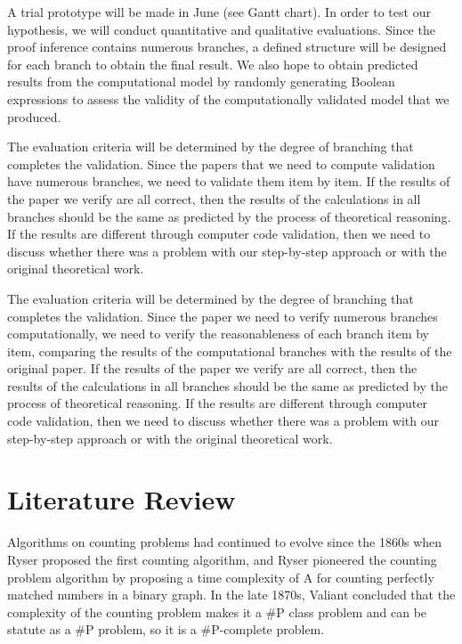 \documentclass{sigchi}
\begin{document}
A trial prototype will be made in June (see Gantt chart). In order to test our hypothesis, we will conduct quantitative and qualitative evaluations. Since the proof inference contains numerous branches, a defined structure will be designed for each branch to obtain the final result. We also hope to obtain predicted results from the computational model by randomly generating Boolean expressions to assess the validity of the computationally validated model that we produced.

The evaluation criteria will be determined by the degree of branching that completes the validation. Since the papers that we need to compute validation have numerous branches, we need to validate them item by item. If the results of the paper we verify are all correct, then the results of the calculations in all branches should be the same as predicted by the process of theoretical reasoning. If the results are different through computer code validation, then we need to discuss whether there was a problem with our step-by-step approach or with the original theoretical work.

The evaluation criteria will be determined by the degree of branching that completes the validation. Since the paper we need to verify numerous branches computationally, we need to verify the reasonableness of each branch item by item, comparing the results of the computational branches with the results of the original paper. If the results of the paper we verify are all correct, then the results of the calculations in all branches should be the same as predicted by the process of theoretical reasoning. If the results are different through computer code validation, then we need to discuss whether there was a problem with our step-by-step approach or with the original theoretical work.

\section{Literature Review}
Algorithms on counting problems had continued to evolve since the 1860s when Ryser proposed the first counting algorithm\cite{10.1017/s0013091500011299}, and Ryser pioneered the counting problem algorithm by proposing a time complexity of A for counting perfectly matched numbers in a binary graph. In the late 1870s, Valiant concluded that the complexity of the counting problem makes it a \#P class problem and can be statute as a \#P problem, so it is a \#P-complete problem\cite{10.1016/0304-3975(79)90044-6}.
\end{document}
